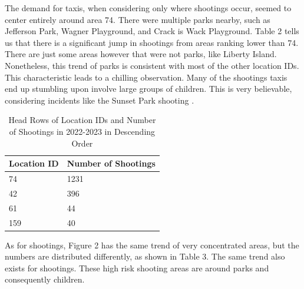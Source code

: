\documentclass[11pt]{article}
\begin{document}
The demand for taxis, when considering only where shootings occur, seemed to center entirely around area 74. There were multiple parks nearby, such as Jefferson Park, Wagner Playground, and Crack is Wack Playground. Table 2 tells us that there is a significant jump in shootings from areas ranking lower than 74.  There are just some areas however that were not parks, like Liberty Island. Nonetheless, this trend of parks is consistent with most of the other location IDs. This characteristic leads to a chilling observation. Many of the shootings taxis end up stumbling upon involve large groups of children. This is very believable, considering incidents like the Sunset Park shooting \cite{sunsetpark}.

\begin{table}[h]
	\begin{center}
		\begin{tabular}{|l|l|}			
			\hline
			Location ID & Number of Shootings\\
			\hline\hline
                74 & 1231 \\
			42 & 396\\
                61 & 44 \\
                159 & 40 \\
			\hline
		\end{tabular}
		\caption{Head Rows of Location IDs and Number of Shootings in 2022-2023 in Descending Order}
		\label{table1}
	\end{center}
\end{table}

As for shootings, Figure 2 has the same trend of very concentrated areas, but the numbers are distributed differently, as shown in Table 3. The same trend also exists for shootings. These high risk shooting areas are around parks and consequently children.
\end{document}
